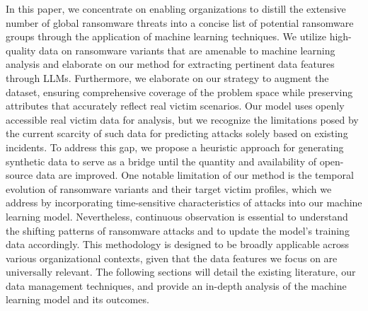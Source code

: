 \documentclass[running heads]{llncs}
\begin{document}

In this paper, we concentrate on enabling organizations to distill the extensive number of global ransomware threats into a concise list of potential ransomware groups through the application of machine learning techniques. We utilize high-quality data on ransomware variants that are amenable to machine learning analysis and elaborate on our method for extracting pertinent data features through LLMs. Furthermore, we elaborate on our strategy to augment the dataset, ensuring comprehensive coverage of the problem space while preserving attributes that accurately reflect real victim scenarios. Our model uses openly accessible real victim data for analysis, but we recognize the limitations posed by the current scarcity of such data for predicting attacks solely based on existing incidents. To address this gap, we propose a heuristic approach for generating synthetic data to serve as a bridge until the quantity and availability of open-source data are improved. One notable limitation of our method is the temporal evolution of ransomware variants and their target victim profiles, which we address by incorporating time-sensitive characteristics of attacks into our machine learning model. Nevertheless, continuous observation is essential to understand the shifting patterns of ransomware attacks and to update the model's training data accordingly. This methodology is designed to be broadly applicable across various organizational contexts, given that the data features we focus on are universally relevant. The following sections will detail the existing literature, our data management techniques, and provide an in-depth analysis of the machine learning model and its outcomes.
\end{document}
